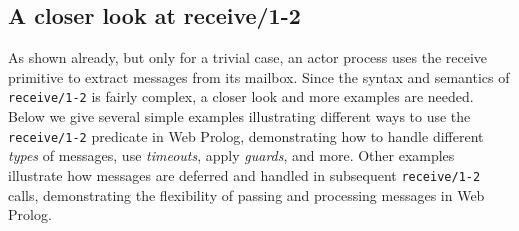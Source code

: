                                 



\subsection{A closer look at receive/1-2}

\noindent As shown already, but only for a trivial case, an actor process uses the receive primitive to extract messages from its mailbox. Since the syntax and semantics of \texttt{receive/1-2} is fairly complex, a closer look and more examples are needed. Below we give several simple examples illustrating different ways to use the  \texttt{receive/1-2} predicate in Web Prolog, demonstrating how to handle different \textit{types} of messages, use \textit{timeouts}, apply \textit{guards}, and more. Other examples illustrate how messages are deferred and handled in subsequent \texttt{receive/1-2} calls, demonstrating the flexibility of passing and processing messages in Web Prolog.

